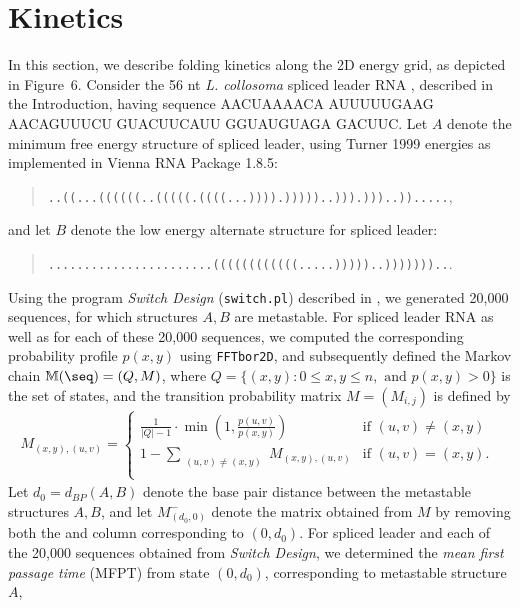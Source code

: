 \section{Kinetics}
\label{section:kinetics}

In this section, we describe folding kinetics along the 2D energy
grid, as depicted in
Figure~6.
Consider the
56 nt {\em L. collosoma} spliced leader RNA \cite{lecuyerCrothers},
described in the Introduction, having
sequence AACUAAAACA AUUUUUGAAG AACAGUUUCU GUACUUCAUU GGUAUGUAGA
GACUUC.
Let $A$ denote the minimum free energy structure of spliced leader,
using Turner 1999 energies as implemented in Vienna RNA Package 1.8.5:
\begin{quote}
{\tt ..((...((((((..(((((.((((...)))).)))))..))).)))..)).....},
\end{quote}
and let $B$ denote the low energy alternate structure for spliced leader:
\begin{quote}
{\tt .......................((((((((((((.....)))))..)))))))..}.
\end{quote}
Using the program {\em Switch Design} ({\tt switch.pl}) described in
\cite{Flamm.r01}, we generated 20,000 sequences, for which structures
$A,B$ are metastable. For spliced leader RNA as well as for each of
these 20,000 sequences, we computed the corresponding
probability profile $p(x,y)$ using {\tt FFTbor2D},
and subsequently defined the Markov chain ${\mathbb{M}}(\seq) = (Q,M)$, where
$Q = \{ (x,y) : 0 \leq x,y \leq n, \mbox{ and } p(x,y)>0 \}$
is the set of states, and the
transition probability matrix $M = (M_{i,j})$ is defined by
\begin{eqnarray*}
M_{(x,y), (u,v)} = \left\{ \begin{array}{ll}
\frac{1}{|Q|-1} \cdot \min(1, \frac{p(u,v)}{p(x,y)})
&\mbox{if $(u,v) \ne (x,y)$}\\
1 - \displaystyle\sum_{\substack{(u,v) \ne (x,y)}} M_{(x,y),(u,v)}
&\mbox{if $(u,v) = (x,y)$. }\\
\end{array} \right.
\end{eqnarray*}
Let $d_0=d_{BP}(A,B)$ denote the base pair distance between the metastable
structures $A,B$, and let $M^{-}_{(d_0,0)}$ denote the matrix obtained from
$M$ by removing both the and column corresponding to $(0,d_0)$.
For spliced leader and each of the 20,000 sequences obtained from
{\em Switch Design}, we determined the {\em mean first passage time} (MFPT)
from state $(0,d_0)$, corresponding to metastable structure $A$,
